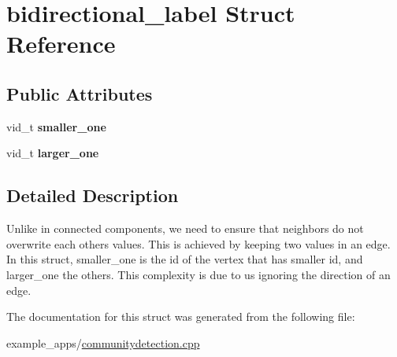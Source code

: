 \hypertarget{structbidirectional__label}{\section{bidirectional\-\_\-label Struct Reference}
\label{structbidirectional__label}
}
\subsection*{Public Attributes}
\begin{DoxyCompactItemize}
\item 
\hypertarget{structbidirectional__label_a69dbe6415de3b814ee699a5df2ed5702}{vid\-\_\-t {\bfseries smaller\-\_\-one}}\label{structbidirectional__label_a69dbe6415de3b814ee699a5df2ed5702}

\item 
\hypertarget{structbidirectional__label_a6007bbff3e619f639b83b174d9c00fe9}{vid\-\_\-t {\bfseries larger\-\_\-one}}\label{structbidirectional__label_a6007bbff3e619f639b83b174d9c00fe9}

\end{DoxyCompactItemize}


\subsection{Detailed Description}
Unlike in connected components, we need to ensure that neighbors do not overwrite each others values. This is achieved by keeping two values in an edge. In this struct, smaller\-\_\-one is the id of the vertex that has smaller id, and larger\-\_\-one the others. This complexity is due to us ignoring the direction of an edge. 

The documentation for this struct was generated from the following file\-:\begin{DoxyCompactItemize}
\item 
example\-\_\-apps/\hyperlink{communitydetection_8cpp}{communitydetection.\-cpp}\end{DoxyCompactItemize}

